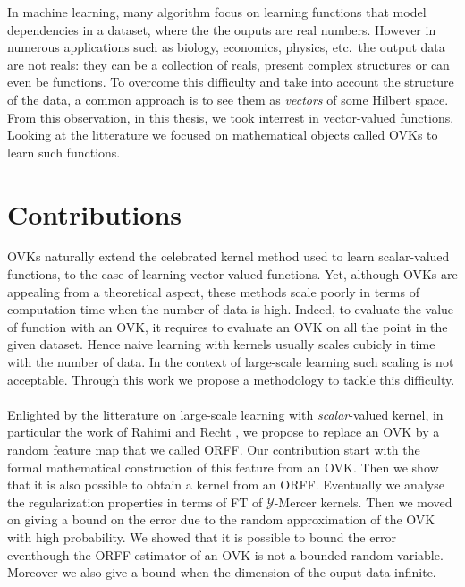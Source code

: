 In machine learning, many algorithm focus on learning functions that model
dependencies in a dataset, where the the ouputs are real numbers. However
in numerous applications such as biology, economics, physics, etc.~the
output data are not reals: they can be a collection of reals, present
complex structures or can even be functions. To overcome this difficulty
and take into account the structure of the data, a common approach is to
see them as \emph{vectors} of some Hilbert space. From this observation, in
this thesis, we took interrest in vector-valued functions. Looking at the
litterature we focused on mathematical objects called \aclp{OVK} to learn
such functions.

\section{Contributions}
\acsp{OVK} naturally extend the celebrated kernel method used to learn
scalar-valued functions, to the case of learning vector-valued functions.
Yet, although \acsp{OVK} are appealing from a theoretical aspect, these
methods scale poorly in terms of computation time when the number of data
is high. Indeed, to evaluate the value of function with an \acl{OVK}, it
requires to evaluate an \acl{OVK} on all the point in the given dataset.
Hence naive learning with kernels usually scales cubicly in time with the
number of data. In the context of large-scale learning such scaling is not
acceptable. Through this work we propose a methodology to tackle this
difficulty.
\paragraph{}
Enlighted by the litterature on large-scale learning with
\emph{scalar}-valued kernel, in particular the work of Rahimi and Recht
\citep{Rahimi2007}, we propose to replace an \acs{OVK} by a random feature
map that we called \acl{ORFF}. Our contribution start with the formal
mathematical construction of this feature from an \acs{OVK}. Then we show
that it is also possible to obtain a kernel from an \acs{ORFF}. Eventually
we analyse the regularization properties in terms of \acl{FT} of
$\mathcal{Y}$-Mercer kernels. Then we moved on giving a bound on the error
due to the random approximation of the \acs{OVK} with high probability.
We showed that it is possible to bound the error eventhough the \acs{ORFF}
estimator of an \acs{OVK} is not a bounded random variable. Moreover we
also give a bound when the dimension of the ouput data infinite.

